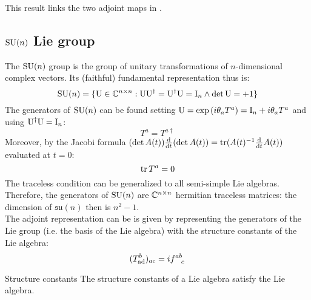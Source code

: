 This result links the two adjoint maps in .

\subsection{\texorpdfstring{$ \mathrm{SU}(n) $}{SU(2)} Lie group}

The $ \mathrm{SU}(n) $ group is the group of unitary transformations of $ n $-dimensional complex vectors. Its (faithful) fundamental representation thus is:
\begin{equation*}
  \mathrm{SU}(n) = \{\mathrm{U} \in \mathbb{C}^{n \times n} : \mathrm{U}\mathrm{U}^\dagger = \mathrm{U}^\dagger\mathrm{U} = \mathrm{I}_n \land \det{\mathrm{U}} = +1 \}
\end{equation*}
The generators of $ \mathrm{SU}(n) $ can be found setting $ \mathrm{U} = \exp \left( i \theta_a T^a \right) = \mathrm{I}_n + i \theta_a T^a $ and using $ \mathrm{U}^\dagger\mathrm{U} = \mathrm{I}_n $:
\begin{equation}
  T^a = T^{a\dagger}
  \label{eq:sun-herm}
\end{equation}
Moreover, by the Jacobi formula $ (\det A(t)) \frac{\mathrm{d}}{\mathrm{d} t} (\det A(t)) = \operatorname{tr} (A(t)^{-1} \frac{\mathrm{d}}{\mathrm{d} t} A(t)) $ evaluated at $ t = 0 $:
\begin{equation}
  \operatorname{tr} T^a = 0
  \label{eq:sun-trace}
\end{equation}
The traceless condition can be generalized to all semi-simple Lie algebras.
Therefore, the generators of $ \mathrm{SU}(n) $ are $ \mathbb{C}^{n \times n} $ hermitian traceless matrices: the dimension of $ \mathfrak{su}(n) $ then is $ n^2 - 1 $.\\
The adjoint representation can be is given by representing the generators of the Lie group (i.e. the basis of the Lie algebra) with the structure constants of the Lie algebra:
\begin{equation}
  (T^b_\text{ad})_{ac} = i \tensor{f}{^a^b_c}
\end{equation}

\begin{proposition}{Structure constants}{}
  The structure constants of a Lie algebra satisfy the Lie algebra.
\end{proposition}

